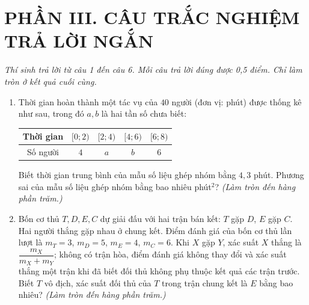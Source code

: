 \documentclass[12pt,a4paper]{article}
\begin{document}
\section*{\large PHẦN III. CÂU TRẮC NGHIỆM TRẢ LỜI NGẮN}
\textit{Thí sinh trả lời từ câu 1 đến câu 6. Mỗi câu trả lời đúng được 0,5 điểm. Chỉ làm tròn ở kết quả cuối cùng.}
\begin{enumerate}
\item Thời gian hoàn thành một tác vụ của $40$ người (đơn vị: phút) được thống kê như sau, trong đó $a,b$ là hai tần số chưa biết:
\begin{center}\begin{tabular}{|c|c|c|c|c|}\hline
Thời gian & $[0;2)$ & $[2;4)$ & $[4;6)$ & $[6;8)$\\\hline
Số người & $4$ & $a$ & $b$ & $6$\\\hline\end{tabular}\end{center}
Biết thời gian trung bình của mẫu số liệu ghép nhóm bằng $4{,}3$ phút. Phương sai của mẫu số liệu ghép nhóm bằng bao nhiêu phút$^2$? \textit{(Làm tròn đến hàng phần trăm.)}

\item Bốn cơ thủ $T,D,E,C$ dự giải đấu với hai trận bán kết: $T$ gặp $D$, $E$ gặp $C$. Hai người thắng gặp nhau ở chung kết. Điểm đánh giá của bốn cơ thủ lần lượt là $m_T=3$, $m_D=5$, $m_E=4$, $m_C=6$. Khi $X$ gặp $Y$, xác suất $X$ thắng là $\dfrac{m_X}{m_X+m_Y}$; không có trận hòa, điểm đánh giá không thay đổi và xác suất thắng một trận khi đã biết đối thủ không phụ thuộc kết quả các trận trước. Biết $T$ vô địch, xác suất đối thủ của $T$ trong trận chung kết là $E$ bằng bao nhiêu? \textit{(Làm tròn đến hàng phần trăm.)}


\end{enumerate}
\end{document}
